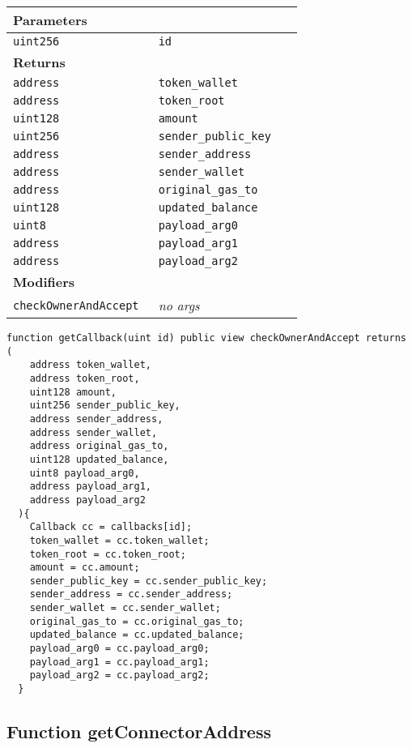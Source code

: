 \ifsoltables
\noindent\begin{tabular}{|l|l|p{5cm}|}\hline
\multicolumn{3}{|l|}{\bf Parameters}\\\hline
\tt uint256 & \tt id &\\\hline
\multicolumn{3}{|l|}{\bf Returns}\\\hline
\tt address & \tt token\_{}wallet &\\\hline
\tt address & \tt token\_{}root &\\\hline
\tt uint128 & \tt amount &\\\hline
\tt uint256 & \tt sender\_{}public\_{}key &\\\hline
\tt address & \tt sender\_{}address &\\\hline
\tt address & \tt sender\_{}wallet &\\\hline
\tt address & \tt original\_{}gas\_{}to &\\\hline
\tt uint128 & \tt updated\_{}balance &\\\hline
\tt uint8 & \tt payload\_{}arg0 &\\\hline
\tt address & \tt payload\_{}arg1 &\\\hline
\tt address & \tt payload\_{}arg2 &\\\hline
\multicolumn{3}{|l|}{\bf Modifiers}\\\hline
\tt checkOwnerAndAccept & {\em no args} &\\\hline
\end{tabular}
\fi



\begin{lstlisting}[firstnumber=318]
  function getCallback(uint id) public view checkOwnerAndAccept returns (
    address token_wallet,
    address token_root,
    uint128 amount,
    uint256 sender_public_key,
    address sender_address,
    address sender_wallet,
    address original_gas_to,
    uint128 updated_balance,
    uint8 payload_arg0,
    address payload_arg1,
    address payload_arg2
  ){
    Callback cc = callbacks[id];
    token_wallet = cc.token_wallet;
    token_root = cc.token_root;
    amount = cc.amount;
    sender_public_key = cc.sender_public_key;
    sender_address = cc.sender_address;
    sender_wallet = cc.sender_wallet;
    original_gas_to = cc.original_gas_to;
    updated_balance = cc.updated_balance;
    payload_arg0 = cc.payload_arg0;
    payload_arg1 = cc.payload_arg1;
    payload_arg2 = cc.payload_arg2;
  }
\end{lstlisting}

\subsection{Function getConnectorAddress}



